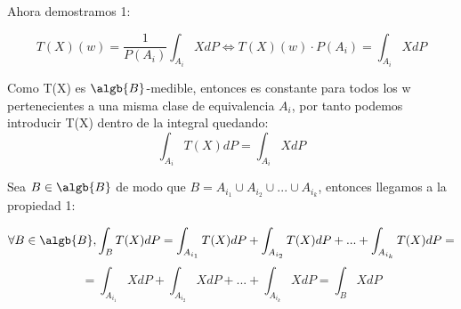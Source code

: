 \begin{problem}[2]
\begin{itemize}
Ahora demostramos 1:

\[
T(X)(w)= \frac{1}{P(A_i)}\int_{A_i}X dP \Leftrightarrow T(X)(w)\cdot P(A_i)= \int_{A_i}X dP
\]

Como T(X) es $\algb{B}$-medible, entonces es constante para todos los w pertenecientes a una misma clase de equivalencia $A_i$, por tanto podemos introducir T(X) dentro de la integral quedando:
\[
\int_{A_i}T(X)dP = \int_{A_i}XdP
\]

Sea $B \in \algb{B}$ de modo que $B=A_{i_1} \cup A_{i_2} \cup ... \cup A_{i_k}$, entonces llegamos a la propiedad 1:

\[
\forall B \in \algb{B}, \int_{B}T(X)dP = \int_{A_{i_1}}T(X)dP + \int_{A_{i_2}}T(X)dP + ... + \int_{A_{i_k}}T(X)dP =
\]
\[
= \int_{A_{i_1}}XdP + \int_{A_{i_2}}XdP + ... + \int_{A_{i_k}}XdP = \int_{B}XdP
\]



\end{itemize}




\end{problem}



